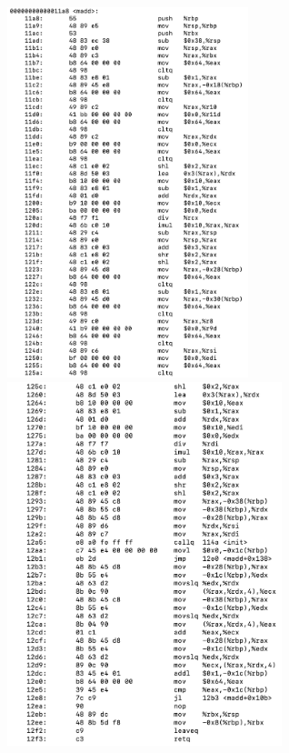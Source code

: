 \documentclass[UTF8, 12pt, a4paper, oneside]{ctexart}
\begin{document}
\begin{enumerate}
                    \begin{figure}[htbp]
                        \centering
                        \includegraphics*[width = 7cm]{1.5.png}
                        \includegraphics*[width = 8cm]{1.6.png}
                    \end{figure}
            \end{enumerate}
        
        \newpage
\end{document}

